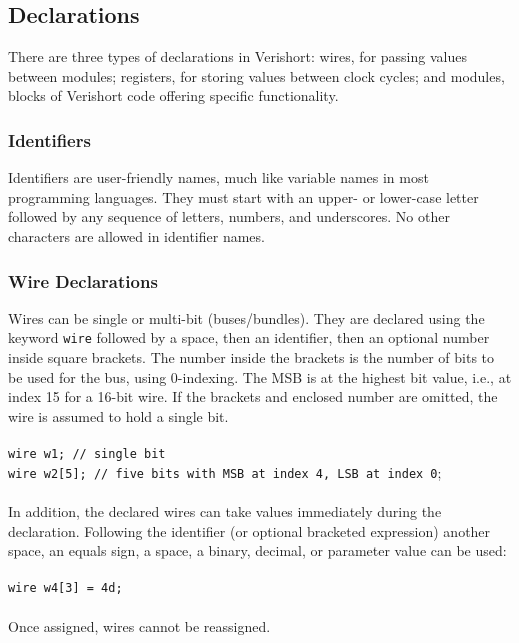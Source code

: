 \documentclass[letterpaper,11pt]{article}
\newcommand{\tab}{\hspace*{2em}}
\begin{document}
    \subsection{Declarations}
    There are three types of declarations in Verishort: wires, for passing values between
    modules; registers, for storing values between clock cycles; and modules, blocks of
    Verishort code offering specific functionality.\\
    
        \subsubsection{Identifiers}
        Identifiers are user-friendly names, much like variable names in most programming
        languages.  They must start with an upper- or lower-case letter followed by any 
        sequence of letters, numbers, and underscores.  No other characters are allowed in
        identifier names.\\
        
        \subsubsection{Wire Declarations}
        Wires can be single or multi-bit (buses/bundles).  They are declared using the keyword
        \texttt{wire} followed by a space, then an identifier, then an optional number inside
        square brackets.  The number inside the brackets is the number of bits to be used for the 
        bus, using 0-indexing.  The MSB is at the highest bit value, i.e., at index 15 for a 16-bit
        wire.  If the brackets and enclosed number are omitted, the wire is assumed to hold a
        single bit.\\\\
        \texttt{wire w1; \tab // single bit}\\
        \texttt{wire w2[5]; // five bits with MSB at index 4, LSB at index 0};\\\\
        In addition, the declared wires can take values immediately during the declaration. 
        Following the identifier (or optional bracketed expression) another space, an equals 
        sign, a space, a binary, decimal, or parameter value can be used:\\\\
        \texttt{wire w4[3] = 4d;}\\\\
        Once assigned, wires cannot be reassigned.\\
        
\end{document}
